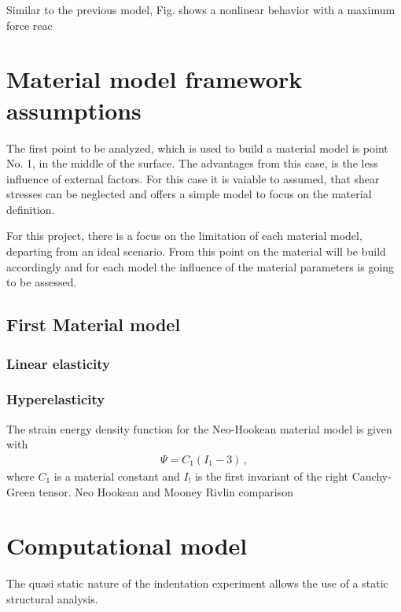 Similar to the previous model, Fig. %
shows a nonlinear behavior with a maximum force reac


\section{Material model framework assumptions}

The first point to be analyzed, which is used to build a material model is point No. 1,
in the middle of the surface. The advantages from this case, is the less influence of
external factors. For this case it is vaiable to assumed, that shear stresses can be 
neglected and offers a simple model to focus on the material definition.

For this project, there is a focus on the limitation of each material model, 
departing from an ideal scenario. From this point on the material will be build 
accordingly and for each model the influence of the material parameters is going
to be assessed.

\subsection{First Material model}

\subsubsection{Linear elasticity}


\subsubsection{Hyperelasticity}
The strain energy density function for the Neo-Hookean material model is given with
\begin{align*}
            \Psi = C_1 (I_1 - 3) \, ,
\end{align*}
where $C_1$ is a material constant and $I_!$ is the first invariant of the right Cauchy-Green tensor. 
Neo Hookean and Mooney Rivlin comparison


\section{Computational model}
The quasi static nature of the indentation experiment allows the use of a static 
structural analysis.

